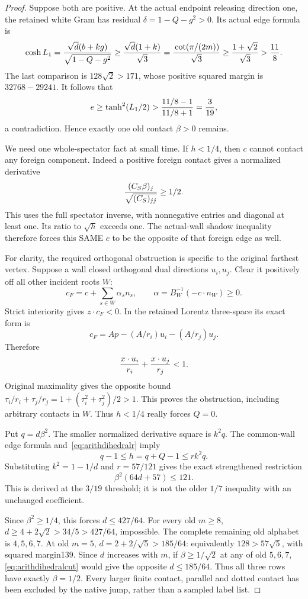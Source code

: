 \documentclass[11pt]{article}
\begin{document}
\begin{proof}
Suppose both are positive.
At the actual endpoint releasing direction one, the retained
white Gram has residual \(\delta=1-Q-g^2>0\).
Its actual edge formula is
\[
 \cosh L_1={\sqrt d(b+kg)\over\sqrt{1-Q-g^2}}
 \ge{\sqrt d(1+k)\over\sqrt3}
 ={\,\cot(\pi/(2m))\over\sqrt3}
 \ge{1+\sqrt2\over\sqrt3}>{11\over8}.
\]
The last comparison is \(128\sqrt2>171\), whose positive
squared margin is \(32768-29241\).
It follows that
\[
 e\ge\tanh^2(L_1/2)>
 {11/8-1\over11/8+1}={3\over19},
\]
a contradiction.  Hence exactly one old contact \(\beta>0\)
remains.

We need one whole-spectator fact at small time.
If \(h<1/4\), then \(c\) cannot contact any foreign component.
Indeed a positive foreign contact gives a normalized derivative
\[
 {(C_S\beta)_j\over\sqrt{(C_S)_{jj}}}\ge1/2 .
\]
This uses the full spectator inverse, with nonnegative entries
and diagonal at least one.
Its ratio to \(\sqrt h\) exceeds one.
The actual-wall shadow inequality therefore forces this SAME
\(c\) to be the opposite of that foreign edge as well.

For clarity, the required orthogonal obstruction is specific to
the original farthest vertex.  Suppose a wall closed orthogonal
dual directions \(u_i,u_j\).
Clear it positively off all other incident roots \(W\):
\[
 c_F=c+\sum_{s\in W}\alpha_sn_s,\qquad
 \alpha=B_W^{-1}(-c\cdot n_W)\ge0.
\]
Strict interiority gives \(z\cdot c_F<0\).
In the retained Lorentz three-space its exact form is
\[
 c_F=A p-(A/r_i)u_i-(A/r_j)u_j .
\]
Therefore
\[
 {x\cdot u_i\over r_i}+{x\cdot u_j\over r_j}<1.
\]
Original maximality gives the opposite bound
\(\tau_i/r_i+\tau_j/r_j
 =1+(\tau_i^2+\tau_j^2)/2>1\).
This proves the obstruction, including arbitrary contacts in \(W\).
Thus \(h<1/4\) really forces \(Q=0\).

Put \(q=d\beta^2\).
The smaller normalized derivative square is \(k^2q\).
The common-wall edge formula and~\eqref{eq:arithdihedralr} imply
\[
 q-1\le h=q+Q-1\le rk^2q .
\]
Substituting \(k^2=1-1/d\) and \(r=57/121\) gives the exact
strengthened restriction
\[
                         \beta^2(64d+57)\le121 .
\tag{Dih2}\label{eq:arithdihedralcut}
\]
This is derived at the \(3/19\) threshold; it is not the older
\(1/7\) inequality with an unchanged coefficient.

Since \(\beta^2\ge1/4\), this forces \(d\le427/64\).
For every old \(m\ge8\),
\(d\ge4+2\sqrt2>34/5>427/64\), impossible.
The complete remaining old alphabet is \(4,5,6,7\).
At old \(m=5\),
\(d=2+2/\sqrt5>185/64\):
equivalently \(128>57\sqrt5\), with squared margin139.
Since \(d\) increases with \(m\), if
\(\beta\ge1/\sqrt2\) at any of old \(5,6,7\),
\eqref{eq:arithdihedralcut} would give the opposite
\(d\le185/64\).
Thus all three rows have exactly \(\beta=1/2\).
Every larger finite contact, parallel and dotted contact has
been excluded by the native jump, rather than a sampled label list.


\end{proof}
\end{document}
